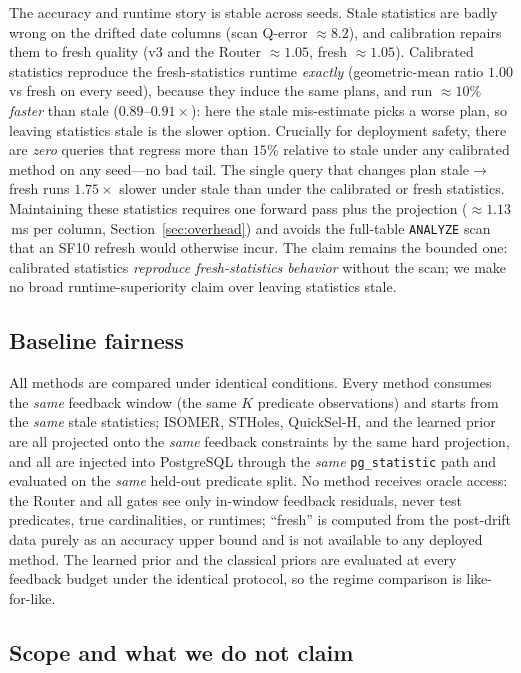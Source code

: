 The accuracy and runtime story is stable across seeds. Stale statistics are badly
wrong on the drifted date columns (scan Q-error $\approx 8.2$), and calibration
repairs them to fresh quality (v3 and the Router $\approx 1.05$, fresh
$\approx 1.05$). Calibrated statistics reproduce the fresh-statistics runtime
\emph{exactly} (geometric-mean ratio $1.00$ vs fresh on every seed), because they
induce the same plans, and run $\approx 10\%$ \emph{faster} than stale
($0.89$--$0.91\times$): here the stale mis-estimate picks a worse plan, so leaving
statistics stale is the slower option. Crucially for deployment safety, there are
\emph{zero} queries that regress more than $15\%$ relative to stale under any
calibrated method on any seed---no bad tail. The single query that changes plan
stale$\to$fresh runs $1.75\times$ slower under stale than under the calibrated or
fresh statistics. Maintaining these statistics requires one forward pass plus the
projection ($\approx 1.13$\,ms per column, Section~\ref{sec:overhead}) and avoids
the full-table \texttt{ANALYZE} scan that an SF10 refresh would otherwise incur.
The claim remains the bounded one: calibrated statistics \emph{reproduce
fresh-statistics behavior} without the scan; we make no broad
runtime-superiority claim over leaving statistics stale.

\subsection{Baseline fairness}
\label{sec:mr-fairness}

All methods are compared under identical conditions. Every method consumes the
\emph{same} feedback window (the same $K$ predicate observations) and starts from
the \emph{same} stale statistics; ISOMER, STHoles, QuickSel-H, and the learned
prior are all projected onto the \emph{same} feedback constraints by the same
hard projection, and all are injected into PostgreSQL through the \emph{same}
\texttt{pg\_statistic} path and evaluated on the \emph{same} held-out predicate
split. No method receives oracle access: the Router and all gates see only
in-window feedback residuals, never test predicates, true cardinalities, or
runtimes; ``fresh'' is computed from the post-drift data purely as an accuracy
upper bound and is not available to any deployed method. The learned prior and
the classical priors are evaluated at every feedback budget under the identical
protocol, so the regime comparison is like-for-like.

\subsection{Scope and what we do not claim}
\label{sec:mr-scope}

